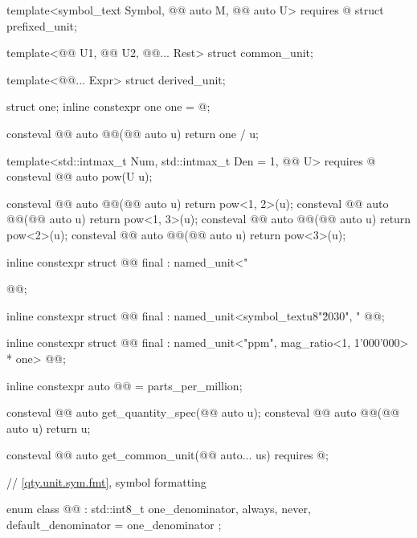\begin{codeblock}
{template<symbol_text Symbol, @@ auto M, @@ auto U>
  requires @\seebelownc@
struct prefixed_unit;

template<@@ U1, @@ U2, @@... Rest>
struct common_unit;

template<@@... Expr>
struct derived_unit;

struct one;
inline constexpr one one = @\seebelownc@;

consteval @@ auto @@(@@ auto u) { return one / u; }

template<std::intmax_t Num, std::intmax_t Den = 1, @@ U>
  requires @\seebelownc@
consteval @@ auto pow(U u);

consteval @@ auto @@(@@ auto u) { return pow<1, 2>(u); }
consteval @@ auto @@(@@ auto u) { return pow<1, 3>(u); }
consteval @@ auto @@(@@ auto u) { return pow<2>(u); }
consteval @@ auto @@(@@ auto u) { return pow<3>(u); }

inline constexpr struct @@ final : named_unit<"%
} @@;

inline constexpr struct @@ final :
    named_unit<symbol_text{u8"\u2030", "%
} @@;

inline constexpr struct @@ final :
    named_unit<"ppm", mag_ratio<1, 1'000'000> * one> {
} @@;

inline constexpr auto @@ = parts_per_million;

consteval @@ auto get_quantity_spec(@@ auto u);
consteval @@ auto @@(@@ auto u) { return u; }

consteval @@ auto get_common_unit(@@ auto... us)
  requires @\seebelownc@;

// \ref{qty.unit.sym.fmt}, symbol formatting

enum class @@ : std::int8_t {
  one_denominator,
  always,
  never,
  default_denominator = one_denominator
};


\end{codeblock}
